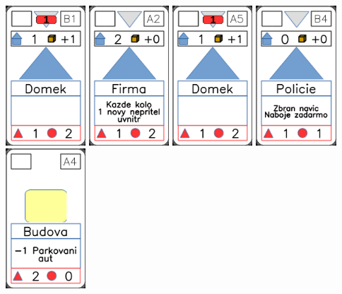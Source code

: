 \documentclass[a4paper]{article}
\begin{document}
	\includegraphics[width=3.0cm]{img-3_5}
	\includegraphics[width=3.0cm]{img-3_16}
	\includegraphics[width=3.0cm]{img-3_4}
	\includegraphics[width=3.0cm]{img-3_8}
	\includegraphics[width=3.0cm]{img-2_3}
\end{document}
